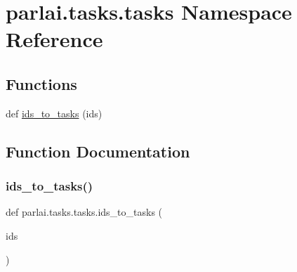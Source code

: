 \hypertarget{namespaceparlai_1_1tasks_1_1tasks}{}\section{parlai.\+tasks.\+tasks Namespace Reference}
\label{namespaceparlai_1_1tasks_1_1tasks}
\subsection*{Functions}
\begin{DoxyCompactItemize}
\item 
def \hyperlink{namespaceparlai_1_1tasks_1_1tasks_ad536d1295ca5ba2ecf3a48635b482087}{ids\+\_\+to\+\_\+tasks} (ids)
\end{DoxyCompactItemize}


\subsection{Function Documentation}
\mbox{\label{namespaceparlai_1_1tasks_1_1tasks_ad536d1295ca5ba2ecf3a48635b482087}} 
\subsubsection{\texorpdfstring{ids\+\_\+to\+\_\+tasks()}{ids\_to\_tasks()}}
{\footnotesize\ttfamily def parlai.\+tasks.\+tasks.\+ids\+\_\+to\+\_\+tasks (\begin{DoxyParamCaption}\item[{}]{ids }\end{DoxyParamCaption})}

